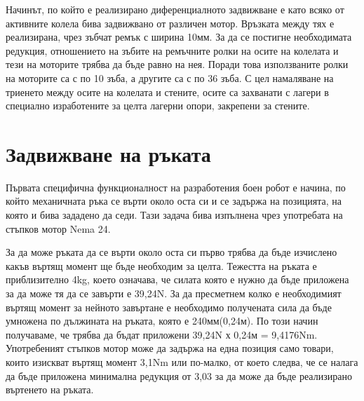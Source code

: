 Начинът, по който е реализирано диференциалното задвижване е като всяко от активните колела бива задвижвано от различен мотор. Връзката между тях е реализирана, чрез зъбчат ремък с ширина 10мм. За да се постигне необходимата редукция, отношението на зъбите на ремъчните ролки на осите на колелата и тези на моторите трябва да бъде равно на нея. Поради това използваните ролки на моторите са с по 10 зъба, а другите са с по 36 зъба. С цел намаляване на триенето между осите на колелата и стените, осите са захванати с лагери в специално изработените за целта лагерни опори, закрепени за стените.


\section{Задвижване на ръката}

Първата специфична функционалност на разработения боен робот е начина, по който механичната ръка се върти около оста си и се задържа на позицията, на която и бива зададено да седи. Тази задача бива изпълнена чрез употребата на стъпков мотор Nema 24.

За да може ръката да се върти около оста си първо трябва да бъде изчислено какъв въртящ момент ще бъде необходим за целта. Тежестта на ръката е приблизително 4kg, което означава, че силата която е нужно да бъде приложена за да може тя да се завърти е 39,24N. За да пресметнем колко е необходимият въртящ момент за нейното завъртане е необходимо получената сила да бъде умножена по дължината на ръката, която е 240мм(0,24м). По този начин получаваме, че трябва да бъдат приложени 39,24N х 0,24м = 9,4176Nm. Употребеният стъпков мотор може да задържа на една позиция само товари, които изискват въртящ момент 3,1Nm или по-малко, от което следва, че се налага да бъде приложена минимална редукция от 3,03 за да може да бъде реализирано въртенето на ръката.

